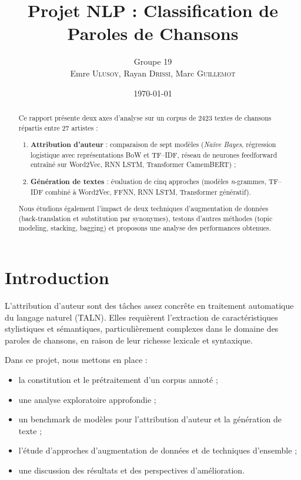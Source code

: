\documentclass[a4paper,11pt]{article}
\title{Projet NLP : \textbf{Classification de Paroles de Chansons}}
\author{Groupe 19 \\ Emre \textsc{Ulusoy}, Rayan \textsc{Drissi}, Marc \textsc{Guillemot}}
\date{\today}
\begin{document}
\maketitle

\begin{abstract}
Ce rapport présente deux axes d\textquoteright analyse sur un corpus de \num{2423} textes de chansons répartis entre 27 artistes :
\begin{enumerate}
  \item \textbf{Attribution d\textquoteright auteur} : comparaison de sept modèles (\emph{Naïve Bayes}, régression logistique avec représentations BoW et TF--IDF, réseau de neurones feedforward entraîné sur Word2Vec, RNN LSTM, Transformer CamemBERT) ;
  \item \textbf{Génération de textes} : évaluation de cinq approches (modèles \emph{n}-grammes, TF--IDF combiné à Word2Vec, FFNN, RNN LSTM, Transformer génératif).
\end{enumerate}
Nous étudions également l\textquoteright impact de deux techniques d\textquoteright augmentation de données (back-translation et substitution par synonymes), testons d'autres méthodes (topic modeling, stacking, bagging) et proposons une analyse des performances obtenues.
\end{abstract}

\section*{Introduction}
L\textquoteright attribution d\textquoteright auteur sont des tâches assez concrête en traitement automatique du langage naturel (TALN). Elles requièrent l\textquoteright extraction de caractéristiques stylistiques et sémantiques, particulièrement complexes dans le domaine des paroles de chansons, en raison de leur richesse lexicale et syntaxique. 

Dans ce projet, nous mettons en place :
\begin{itemize}
  \item la constitution et le prétraitement d\textquoteright un corpus annoté ;
  \item une analyse exploratoire approfondie ;
  \item un benchmark de modèles pour l\textquoteright attribution d\textquoteright auteur et la génération de texte ;
  \item l\textquoteright étude d\textquoteright approches d\textquoteright augmentation de données et de techniques d\textquoteright ensemble ;
  \item une discussion des résultats et des perspectives d\textquoteright amélioration.
\end{itemize}
\end{document}
